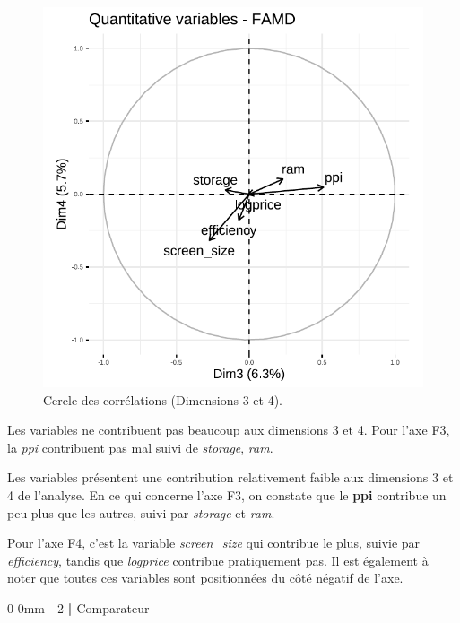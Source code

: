 \documentclass[
  12pt,
]{report}
\makeatletter
\renewcommand{\chapter}{%
    \clearpage %
    \@startsection{chapter}%
    {0} %
    {0mm} %
    {-\baselineskip} %
    {2\baselineskip} %
    {\normalfont\Huge\bfseries | \Huge\bfseries}%
}
\makeatother
\begin{document}
\begin{figure}[H]

{\centering \includegraphics{report_files/figure-pdf/unnamed-chunk-16-1.pdf}

}

\caption{Cercle des corrélations (Dimensions 3 et 4).}

\end{figure}%

Les variables ne contribuent pas beaucoup aux dimensions 3 et 4. Pour
l'axe F3, la \emph{ppi} contribuent pas mal suivi de \emph{storage},
\emph{ram}.

Les variables présentent une contribution relativement faible aux
dimensions 3 et 4 de l'analyse. En ce qui concerne l'axe F3, on constate
que le \textbf{ppi} contribue un peu plus que les autres, suivi par
\emph{storage} et \emph{ram}.

Pour l'axe F4, c'est la variable \emph{screen\_size} qui contribue le
plus, suivie par \emph{efficiency}, tandis que \emph{logprice} contribue
pratiquement pas. Il est également à noter que toutes ces variables sont
positionnées du côté négatif de l'axe.

\chapter{Comparateur}\label{comparateur}
\end{document}
